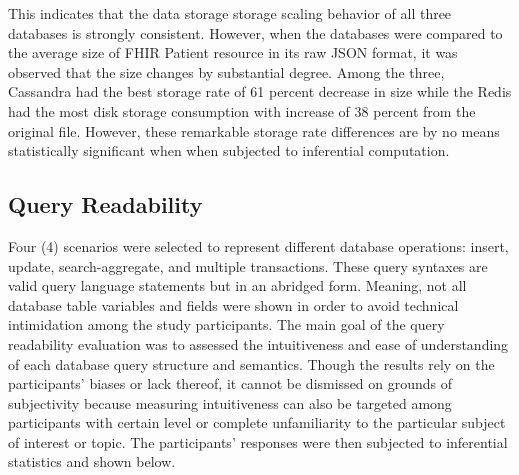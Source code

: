 \documentclass[5p]{elsarticle}
\begin{document}
This indicates that the data storage storage scaling behavior of all three databases is strongly consistent. 
However, when the databases were compared to the average size of FHIR Patient resource in its raw JSON format, 
it was observed that the size changes by substantial degree. Among the three, Cassandra had the best storage rate of 61 percent 
decrease in size while the Redis had the most disk storage consumption with increase of 38 percent from the original file. 
However, these remarkable storage rate differences are by no means statistically significant when when subjected to inferential computation.

\subsection{Query Readability}
Four (4) scenarios were selected to represent different database operations: 
insert, update, search-aggregate, and multiple transactions. 
These query syntaxes are valid query language statements but in an abridged form. 
Meaning, not all database table variables and fields were shown in order to avoid technical intimidation among the study participants. 
The main goal of the query readability evaluation was to assessed the intuitiveness and ease of understanding 
of each database query structure and semantics. 
Though the results rely on the participants’ biases or lack thereof, it cannot be dismissed on grounds of subjectivity because measuring intuitiveness 
can also be targeted among participants with certain level or complete unfamiliarity to the particular subject of interest or topic. 
The participants’ responses were then subjected to inferential statistics and shown below.
\end{document}
